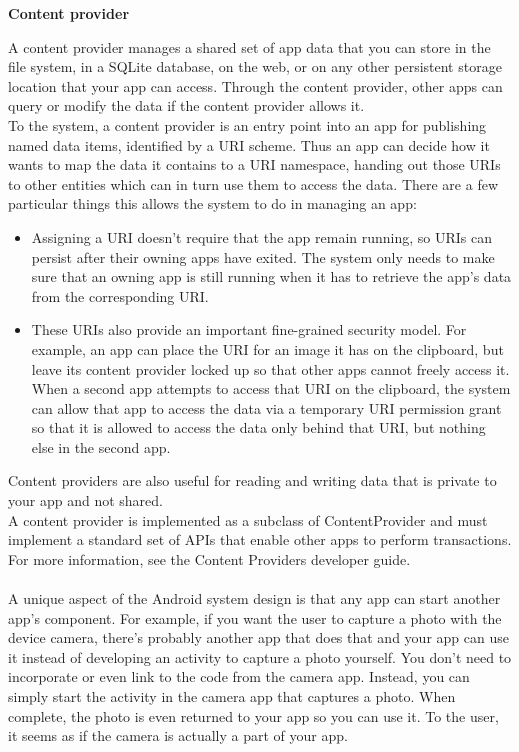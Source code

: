 \textbf{Content provider}

A content provider manages a shared set of app data that you can store in the file system, in a SQLite database, on the web, or on any other persistent storage location that your app can access. 
Through the content provider, other apps can query or modify the data if the content provider allows it.\\

To the system, a content provider is an entry point into an app for publishing named data items, identified by a URI scheme. 
Thus an app can decide how it wants to map the data it contains to a URI namespace, handing out those URIs to other entities which can in turn use them to access the data. 
There are a few particular things this allows the system to do in managing an app:
\begin{itemize}
    \item Assigning a URI doesn't require that the app remain running, so URIs can persist after their owning apps have exited. 
    The system only needs to make sure that an owning app is still running when it has to retrieve the app's data from the corresponding URI.
    \item These URIs also provide an important fine-grained security model. 
    For example, an app can place the URI for an image it has on the clipboard, but leave its content provider locked up so that other apps cannot freely access it. 
    When a second app attempts to access that URI on the clipboard, 
    the system can allow that app to access the data via a temporary URI permission grant so that it is allowed to access the data only behind that URI, but nothing else in the second app.
\end{itemize}
Content providers are also useful for reading and writing data that is private to your app and not shared.\\
A content provider is implemented as a subclass of ContentProvider and must implement a standard set of APIs that enable other apps to perform transactions. 
For more information, see the Content Providers developer guide.\\\\


A unique aspect of the Android system design is that any app can start another app’s component. 
For example, if you want the user to capture a photo with the device camera, 
there's probably another app that does that and your app can use it instead of developing an activity to capture a photo yourself. 
You don't need to incorporate or even link to the code from the camera app. 
Instead, you can simply start the activity in the camera app that captures a photo. 
When complete, the photo is even returned to your app so you can use it. To the user, it seems as if the camera is actually a part of your app.\\

